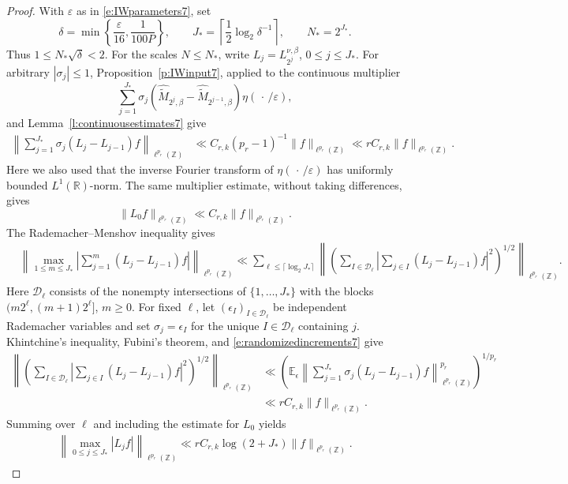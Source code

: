 \documentclass[12pt,reqno]{amsart}
\numberwithin{equation}{section}
\theoremstyle{definition}
\theoremstyle{remark}
\begin{document}
\begin{proof}
With \(\varepsilon\) as in \eqref{e:IWparameters7}, set
\[
 \delta=\min\left\{\frac{\varepsilon}{16},\frac1{100P}\right\},
 \qquad
 J_*=\left\lceil\frac12\log_2\delta^{-1}\right\rceil,
 \qquad
 N_*=2^{J_*}.
\]
Thus \(1\leq N_*\sqrt\delta<2\).
For the scales \(N\leq N_*\), write
\(L_j=L_{2^j}^{\nu,\beta}\), \(0\leq j\leq J_*\).
For arbitrary \(|\sigma_j|\leq1\),
Proposition~\ref{p:IWinput7}, applied to the continuous multiplier
\[
 \sum_{j=1}^{J_*}\sigma_j
 \left(
 \widehat{\widetilde M}_{2^j,\beta}
 -
 \widehat{\widetilde M}_{2^{j-1},\beta}
 \right)\eta(\,\cdot\,/\varepsilon),
\]
and Lemma~\ref{l:continuousestimates7} give
\begin{align}\label{e:randomizedincrements7}
 \left\|
 \sum_{j=1}^{J_*}\sigma_j(L_j-L_{j-1})f
 \right\|_{\ell^{p_r}(\mathbb Z)}
 &\ll
 C_{r,k}(p_r-1)^{-1}\|f\|_{\ell^{p_r}(\mathbb Z)}
 \ll
 rC_{r,k}\|f\|_{\ell^{p_r}(\mathbb Z)}.
\end{align}
Here we also used that the inverse Fourier transform of
\(\eta(\,\cdot\,/\varepsilon)\) has uniformly bounded
\(L^1(\mathbb R)\)-norm. The same multiplier estimate, without taking
differences, gives
\[
 \|L_0f\|_{\ell^{p_r}(\mathbb Z)}
 \ll C_{r,k}\|f\|_{\ell^{p_r}(\mathbb Z)}.
\]
The Rademacher--Menshov inequality
\cite[(2.7)]{MirekSteinZorinKranich} gives
\begin{align*}
 &\left\|
 \max_{1\leq m\leq J_*}
 \left|\sum_{j=1}^m(L_j-L_{j-1})f\right|
 \right\|_{\ell^{p_r}(\mathbb Z)}\ll
 \sum_{\ell\leq\lceil\log_2J_*\rceil}
 \left\|
 \left(
 \sum_{I\in\mathcal D_\ell}
 \left|\sum_{j\in I}(L_j-L_{j-1})f\right|^2
 \right)^{1/2}
 \right\|_{\ell^{p_r}(\mathbb Z)}.
\end{align*}
Here \(\mathcal D_\ell\) consists of the nonempty intersections
of \(\{1,\ldots,J_*\}\) with the blocks
\((m2^\ell,(m+1)2^\ell]\), \(m\geq0\).
For fixed \(\ell\), let
\((\epsilon_I)_{I\in\mathcal D_\ell}\) be independent Rademacher
variables and set \(\sigma_j=\epsilon_I\) for the unique
\(I\in\mathcal D_\ell\) containing \(j\).  Khintchine's inequality,
Fubini's theorem, and \eqref{e:randomizedincrements7} give
\begin{align*}
 \left\|
 \left(
 \sum_{I\in\mathcal D_\ell}
 \left|\sum_{j\in I}(L_j-L_{j-1})f\right|^2
 \right)^{1/2}
 \right\|_{\ell^{p_r}(\mathbb Z)}
 &\ll
 \left(
 \mathbb E_\epsilon
 \left\|
 \sum_{j=1}^{J_*}\sigma_j(L_j-L_{j-1})f
 \right\|_{\ell^{p_r}(\mathbb Z)}^{p_r}
 \right)^{1/p_r}\\
 &\ll rC_{r,k}\|f\|_{\ell^{p_r}(\mathbb Z)}.
\end{align*}
 Summing over \(\ell\) and including
the estimate for \(L_0\) yields
\begin{align}\label{e:boundedscales7}
 \left\|
 \max_{0\leq j\leq J_*}|L_jf|
 \right\|_{\ell^{p_r}(\mathbb Z)}
 \ll
 rC_{r,k}\log(2+J_*)
 \|f\|_{\ell^{p_r}(\mathbb Z)}.
\end{align}



\end{proof}
\end{document}
